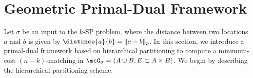 \section{Geometric Primal-Dual Framework}\label{sec:geo-primal-dual}

Let $\sigma$ be an input to the $k$-SP problem, where the distance between two locations $a$ and $b$ is given by $\distance{a}{b}=\|a-b\|_p$. In this section, we introduce a primal-dual framework based on hierarchical partitioning to compute a minimum-cost $(n-k)$-matching in $\mcG_\sigma=(A\cup B, E\subset A\times B)$. We begin by describing the hierarchical partitioning scheme.



